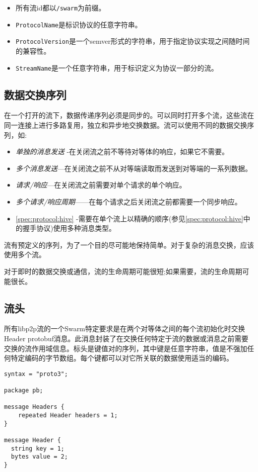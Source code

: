 \begin{itemize}
\item 所有流id都以\lstinline{/swarm}为前缀。
\item \lstinline{ProtocolName}是标识协议的任意字符串。
\item \lstinline{ProtocolVersion}是一个semver形式的字符串，用于指定协议实现之间随时间的兼容性。
\item \lstinline{StreamName}是一个任意字符串，用于标识定义为协议一部分的流。
\end{itemize}

\subsection{数据交换序列\statusgreen}

在一个打开的流下，数据传递序列必须是同步的。可以同时打开多个流，这些流在同一连接上进行多路复用，独立和异步地交换数据。流可以使用不同的数据交换序列，如:

\begin{itemize}
\item \emph{单独的消息发送} -在关闭流之前不等待对等体的响应，如果它不需要。
\item \emph{多个消息发送}—在关闭流之前不从对等端读取而发送到对等端的一系列数据。
\item \emph{请求/响应}—在关闭流之前需要对单个请求的单个响应。
\item \emph{多个请求/响应周期}——在每个请求之后关闭流之前都需要一个同步响应。
\item \ref{spec:protocol:hive} -需要在单个流上以精确的顺序(参见\ref{spec:protocol:hive}中的握手协议)使用多种消息类型。
\end{itemize}

流有预定义的序列，为了一个目的尽可能地保持简单。对于复杂的消息交换，应该使用多个流。

对于即时的数据交换或通信，流的生命周期可能很短;如果需要，流的生命周期可能很长。

\subsection{流头}

所有libp2p流的一个Swarm特定要求是在两个对等体之间的每个流初始化时交换Header protobuf消息。此消息封装了在交换任何特定于流的数据或消息之前需要交换的流作用域信息。标头是键值对的序列，其中键是任意字符串，值是不强加任何特定编码的字节数组。每个键都可以对它所关联的数据使用适当的编码。

\begin{definition}\label{def:headers-message}

\begin{lstlisting}[language=protobuf3]
syntax = "proto3";

package pb;

message Headers {
    repeated Header headers = 1;
}

message Header {
  string key = 1;
  bytes value = 2;
}
\end{lstlisting}
\end{definition}

